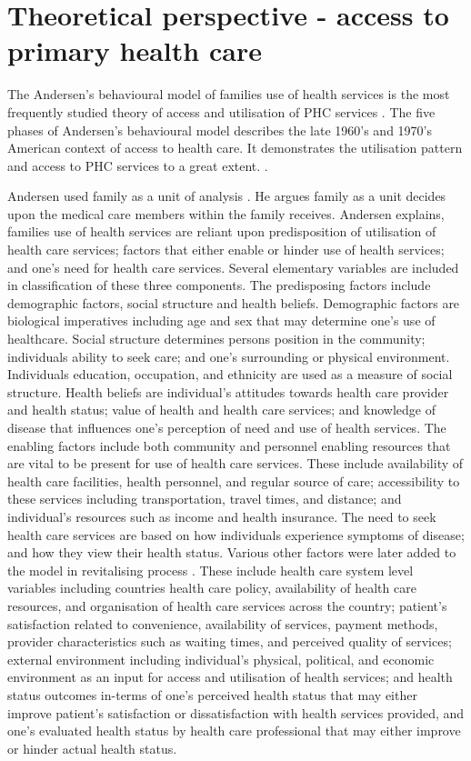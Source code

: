 \section{Theoretical perspective - access to primary health care}

The Andersen's behavioural model of families use of health services is the most frequently studied theory of access and utilisation of PHC services \cite{balogh2013factors}. The five phases of Andersen's behavioural model describes the late 1960's and 1970's American context of access to health care. It demonstrates the utilisation pattern and access to PHC services to a great extent. \cite{balogh2013factors}. 

Andersen used family as a unit of analysis \cite{andersen1968behavioral}. He argues family as a unit decides upon the medical care members within the family receives. Andersen explains, families use of health services are reliant upon predisposition of utilisation of health care services; factors that either enable or hinder use of health services; and one's need for health care services. Several elementary variables are included in classification of these three components. The predisposing factors include demographic factors, social structure and health beliefs. Demographic factors are biological imperatives including age and sex that may determine one's use of healthcare. Social structure determines persons position in the community; individuals ability to seek care; and one's surrounding or physical environment. Individuals education, occupation, and ethnicity are used as a measure of social structure. Health beliefs are individual's attitudes towards health care provider and health status; value of health and health care services; and knowledge of disease that influences one's perception of need and use of health services. The enabling factors include both community and personnel enabling resources that are vital to be present for use of health care services. These include availability of health care facilities, health personnel, and regular source of care; accessibility to these services including transportation, travel times, and distance; and individual's resources such as income and health insurance. The need to seek health care services are based on how individuals experience symptoms of disease; and how they view their health status. Various other factors were later added to the model in revitalising process \cite{andersen1995revisiting}. These include health care system level variables including countries health care policy, availability of health care resources, and organisation of health care services across the country; patient's satisfaction related to convenience, availability of services, payment methods, provider characteristics such as waiting times, and perceived quality of services; external environment including individual's physical, political, and economic environment as an input for access and utilisation of health services; and health status outcomes in-terms of one's perceived health status that may either improve patient's satisfaction or dissatisfaction with health services provided, and one's evaluated health status by health care professional that may either improve or hinder actual health status. 

